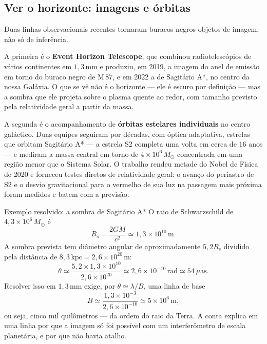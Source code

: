 \documentclass[11pt,a4paper]{article}
\begin{document}
\subsection*{Ver o horizonte: imagens e órbitas}

Duas linhas observacionais recentes tornaram buracos negros objetos de imagem, não só de inferência.

A primeira é o \textbf{Event Horizon Telescope}, que combinou radiotelescópios de vários continentes em $1{,}3\,\mathrm{mm}$ e produziu, em 2019, a imagem do anel de emissão em torno do buraco negro de M\,87, e em 2022 a de Sagitário A*, no centro da nossa Galáxia. O que se vê não é o horizonte --- ele é escuro por definição --- mas a sombra que ele projeta sobre o plasma quente ao redor, com tamanho previsto pela relatividade geral a partir da massa.

A segunda é o acompanhamento de \textbf{órbitas estelares individuais} no centro galáctico. Duas equipes seguiram por décadas, com óptica adaptativa, estrelas que orbitam Sagitário A* --- a estrela S2 completa uma volta em cerca de $16$ anos --- e mediram a massa central em torno de $4\times10^{6}\,M_\odot$ concentrada em uma região menor que o Sistema Solar. O trabalho rendeu metade do Nobel de Física de 2020 e forneceu testes diretos de relatividade geral: o avanço do periastro de S2 e o desvio gravitacional para o vermelho de sua luz na passagem mais próxima foram medidos e batem com a previsão.

\begin{lessonblock}{Exemplo resolvido: a sombra de Sagitário A*}
O raio de Schwarzschild de $4{,}3\times10^{6}\,M_\odot$ é
\[
R_s=\frac{2GM}{c^{2}}\simeq1{,}3\times10^{10}\,\mathrm{m}.
\]
A sombra prevista tem diâmetro angular de aproximadamente $5{,}2R_s$ dividido pela distância de $8{,}3\,\mathrm{kpc}=2{,}6\times10^{20}\,\mathrm{m}$:
\[
\theta\simeq\frac{5{,}2\times1{,}3\times10^{10}}{2{,}6\times10^{20}}\simeq2{,}6\times10^{-10}\,\mathrm{rad}\simeq54\ \mu\text{as}.
\]
Resolver isso em $1{,}3\,\mathrm{mm}$ exige, por $\theta\simeq\lambda/B$, uma linha de base
\[
B\simeq\frac{1{,}3\times10^{-3}}{2{,}6\times10^{-10}}\simeq5\times10^{6}\,\mathrm{m},
\]
ou seja, cinco mil quilômetros --- da ordem do raio da Terra. A conta explica em uma linha por que a imagem só foi possível com um interferômetro de escala planetária, e por que não havia atalho.
\end{lessonblock}
\end{document}
